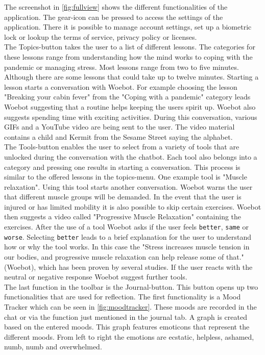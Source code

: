 The screenshot in \autoref{fig:fullview} shows the different functionalities of the application.
The gear-icon can be pressed to access the settings of the application.
There it is possible to manage account settings, set up a biometric lock or lookup the terms of service, privacy policy or licenses.\\

The Topics-button takes the user to a list of different lessons.
The categories for these lessons range from understanding how the mind works to coping with the pandemic or managing stress.
Most lessons range from two to five minutes.
Although there are some lessons that could take up to twelve minutes.
Starting a lesson starts a conversation with Woebot.
For example choosing the lesson "Breaking your cabin fever" from the "Coping with a pandemic" category leads Woebot suggesting that a routine helps keeping the users spirit up.
Woebot also suggests spending time with exciting activities.
During this conversation, various GIFs and a YouTube video are being sent to the user.
The video material contains a child and Kermit from the Sesame Street saying the alphabet. \\

The Tools-button enables the user to select from a variety of tools that are unlocked during the conversation with the chatbot.
Each tool also belongs into a category and pressing one results in starting a conversation.
This process is similar to the offered lessons in the topics-menu. One example tool is "Muscle relaxation".
Using this tool starts another conversation. Woebot warns the user that different muscle groups will be demanded.
In the event that the user is injured or has limited mobility it is also possible to skip certain exercises.
Woebot then suggests a video called "Progressive Muscle Relaxation" containing the exercises.
After the use of a tool Woebot asks if the user feels \texttt{better}, \texttt{same} or \texttt{worse}.
Selecting \texttt{better} leads to a brief explanation for the user to understand how or why the tool works.
In this case the "Stress increases muscle tension in our bodies, and progressive muscle relaxation can help release some of that." (Woebot), which has been proven by several studies\cite{progressive-muscle, stress-pmr}.
If the user reacts with the neutral or negative response Woebot suggest further tools.\\

The last function in the toolbar is the Journal-button.
This button opens up two functionalities that are used for reflection.
The first functionality is a Mood Tracker which can be seen in \autoref{fig:moodtracker}.
These moods are recorded in the chat or via the function just mentioned in the journal tab.
A graph is created based on the entered moods.
This graph features emoticons that represent the different moods.
From left to right the emotions are ecstatic, helpless, ashamed, numb, numb and overwhelmed.

